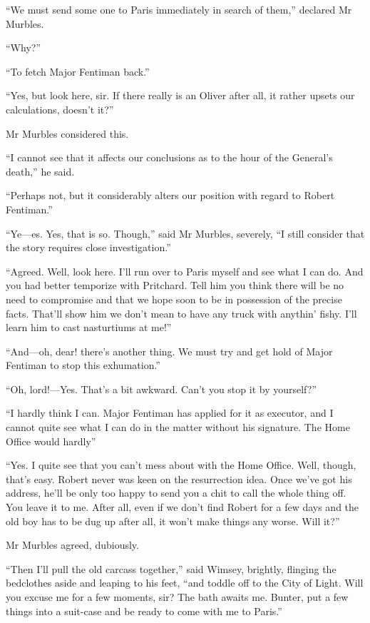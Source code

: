 \enquote{We must send some one to Paris immediately in search of them,} declared Mr Murbles.

\enquote{Why?}

\enquote{To fetch Major Fentiman back.}

\enquote{Yes, but look here, sir. If there really is an Oliver after all, it rather upsets our calculations, doesn't it?}

Mr Murbles considered this.

\enquote{I cannot see that it affects our conclusions as to the hour of the General's death,} he said.

\enquote{Perhaps not, but it considerably alters our position with regard to Robert Fentiman.}

\enquote{Ye\allowbreak---\allowbreak es. Yes, that is so. Though,} said Mr Murbles, severely, \enquote{I still consider that the story requires close investigation.}

\enquote{Agreed. Well, look here. I'll run over to Paris myself and see what I can do. And you had better temporize with Pritchard. Tell him you think there will be no need to compromise and that we hope soon to be in possession of the precise facts. That'll show him we don't mean to have any truck with anythin' fishy. I'll learn him to cast nasturtiums at me!}

\enquote{And\allowbreak---\allowbreak oh, dear! there's another thing. We must try and get hold of Major Fentiman to stop this exhumation.}

\enquote{Oh, lord!---Yes. That's a bit awkward. Can't you stop it by yourself?}

\enquote{I hardly think I can. Major Fentiman has applied for it as executor, and I cannot quite see what I can do in the matter without his signature. The Home Office would hardly\longdash}

\enquote{Yes. I quite see that you can't mess about with the Home Office. Well, though, that's easy. Robert never was keen on the resurrection idea. Once we've got his address, he'll be only too happy to send you a chit to call the whole thing off. You leave it to me. After all, even if we don't find Robert for a few days and the old boy has to be dug up after all, it won't make things any worse. Will it?}

Mr Murbles agreed, dubiously.

\enquote{Then I'll pull the old carcass together,} said Wimsey, brightly, flinging the bedclothes aside and leaping to his feet, \enquote{and toddle off to the City of Light. Will you excuse me for a few moments, sir? The bath awaits me. Bunter, put a few things into a suit-case and be ready to come with me to Paris.}

